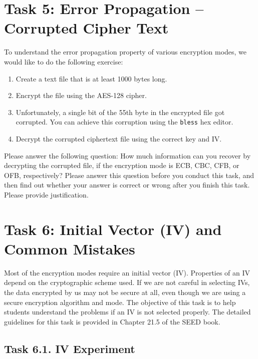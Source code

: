 \section{Task 5: Error Propagation -- Corrupted Cipher Text}


To understand the error propagation property of various encryption modes, we would like to
do the following exercise:

\begin{enumerate}
\item Create a text file that is at least 1000 bytes long.
\item Encrypt the file using the AES-128 cipher.
\item Unfortunately, a single bit of the 55th byte in the encrypted
      file got corrupted. You can achieve this corruption using
      the \texttt{bless} hex editor.
\item Decrypt the corrupted ciphertext file using the correct key and IV.
\end{enumerate}

Please answer the following question:
How much information can you recover by decrypting the corrupted file, if the
encryption mode is ECB, CBC, CFB, or OFB, respectively? Please answer this
question before you conduct this task, and then find out whether your answer
is correct or wrong after you finish this task.
Please provide justification.





\section{Task 6: Initial Vector (IV) and Common Mistakes}

Most of the encryption modes require an initial vector (IV). Properties of an IV depend
on the cryptographic scheme used. If we are not careful in selecting IVs,
the data encrypted by us may not be secure at all, even though we are using
a secure encryption algorithm and mode. The objective of this task is to
help students understand the problems if an IV is not selected properly.
The detailed guidelines for this task is provided in
Chapter 21.5 of the SEED book.


\subsection{Task 6.1. IV Experiment}


